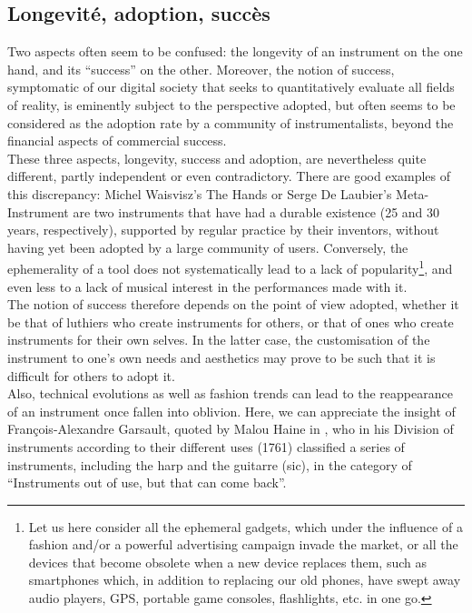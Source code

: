 \subsection{Longevité, adoption, succès}
Two aspects often seem to be confused: the longevity of an instrument on the one hand, and its “success” on the other. Moreover, the notion of success, symptomatic of our digital society that seeks to quantitatively evaluate all fields of reality, is eminently subject to the perspective adopted, but often seems to be considered as the adoption rate by a community of instrumentalists, beyond the financial aspects of commercial success.\\
\indent These three aspects, longevity, success and adoption, are nevertheless quite different, partly independent or even contradictory. There are good examples of this discrepancy: Michel Waisvisz's The Hands \cite{torre_hands:_2016} or Serge De Laubier's Meta-Instrument \cite{couprie_meta-instrument:_2018} are two instruments that have had a durable existence (25 and 30 years, respectively), supported by regular practice by their inventors, without having yet been adopted by a large community of users. Conversely, the ephemerality of a tool does not systematically lead to a lack of popularity\footnote{Let us here consider all the ephemeral gadgets, which under the influence of a fashion and/or a powerful advertising campaign invade the market, or all the devices that become obsolete when a new device replaces them, such as smartphones which, in addition to replacing our old phones, have swept away audio players, GPS, portable game consoles, flashlights, etc. in one go.}, and even less to a lack of musical interest in the performances made with it.\\
\indent The notion of success therefore depends on the point of view adopted, whether it be that of luthiers who create instruments for others, or that of ones who create instruments for their own selves. In the latter case, the customisation of the instrument to one's own needs and aesthetics may prove to be such that it is difficult for others to adopt it.\\
\indent Also, technical evolutions as well as fashion trends can lead to the reappearance of an instrument once fallen into oblivion. Here, we can appreciate the insight of François-Alexandre Garsault, quoted by Malou Haine in \cite{haine_les_2018}, who in his Division of instruments according to their different uses (1761) classified a series of instruments, including the harp and the guitarre (sic), in the category of “Instruments out of use, but that can come back”.

